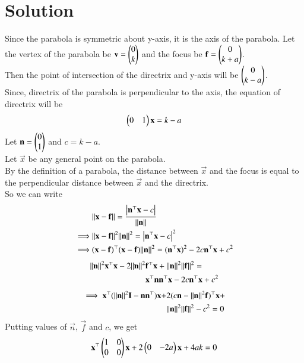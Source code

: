 \documentclass[journal,12pt,twocolumn]{IEEEtran}
\begin{document}
\section{Solution}
Since the parabola is symmetric about y-axis, it is the axis of the parabola. Let the vertex of the parabola be $\mathbf{v}=\begin{pmatrix}0\\k\end{pmatrix}$ and the focus be $\mathbf{f}=\begin{pmatrix}0\\k+a\end{pmatrix}$.\\
Then the point of intersection of the directrix and y-axis will be $\begin{pmatrix}0\\k-a\end{pmatrix}$.\\
Since, directrix of the parabola is perpendicular to the axis, the equation of directrix will be
\begin{align}
    \begin{pmatrix}0&1\end{pmatrix}\mathbf{x}=k-a
\end{align}
Let $\mathbf{n}=\begin{pmatrix}0\\1\end{pmatrix}$ and $c=k-a$.\\
Let $\vec{x}$ be any general point on the parabola.\\ By the definition of a parabola, the distance between $\vec{x}$ and the focus is equal to the perpendicular distance between $\vec{x}$ and the directrix.\\
So we can write
\begin{align}
    &\lVert\mathbf{x}-\mathbf{f}\rVert=\dfrac{\left|\mathbf{n}^\top\mathbf{x}-c\right|}{\lVert\mathbf{n}\rVert}\\
    \implies &\lVert\mathbf{x}-\mathbf{f}\rVert^2\lVert\mathbf{n}\rVert^2=\left|\mathbf{n}^\top\mathbf{x}-c\right|^2\\
    \implies &(\mathbf{x}-\mathbf{f})^\top(\mathbf{x}-\mathbf{f})\lVert\mathbf{n}\rVert^2=(\mathbf{n}^\top\mathbf{x})^2-2c\mathbf{n}^\top\mathbf{x}+c^2
\end{align}
\begin{align}
    \lVert\mathbf{n}\rVert^2\mathbf{x}^\top\mathbf{x}-2\lVert\mathbf{n}\rVert^2&\mathbf{f}^\top\mathbf{x}+\lVert\mathbf{n}\rVert^2\lVert\mathbf{f}\rVert^2 = \nonumber \\
    &\mathbf{x}^\top\mathbf{n}\mathbf{n}^\top\mathbf{x} -2c\mathbf{n}^\top\mathbf{x}+c^2
\end{align}
\begin{align}
    \implies \mathbf{x}^\top(\lVert\mathbf{n}\rVert^2\mathbf{I}-\mathbf{n}\mathbf{n^\top})\mathbf{x}+&2(c\mathbf{n}-\lVert\mathbf{n}\rVert^2\mathbf{f})^\top\mathbf{x}+ \nonumber \\
    &\lVert\mathbf{n}\rVert^2\lVert\mathbf{f}\rVert^2-c^2=0
\end{align}
Putting values of $\vec{n}$, $\vec{f}$ and $c$, we get
\begin{align}
    \mathbf{x}^\top\begin{pmatrix}1&0\\0&0\end{pmatrix}\mathbf{x}+2\begin{pmatrix}0&-2a\end{pmatrix}\mathbf{x}+4ak=0 \label{eq-1}
\end{align}
\end{document}

